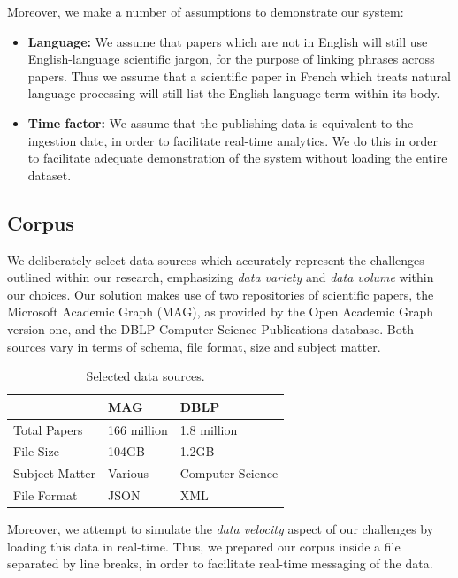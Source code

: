 \documentclass[10pt,journal,final,a4paper]{IEEEtran}
\begin{document}
Moreover, we make a number of assumptions to demonstrate our system:
\begin{itemize}
\item \textbf{Language:} We assume that papers which are not in English will still use English-language scientific jargon, for the purpose of linking phrases across papers. Thus we assume that a scientific paper in French which treats natural language processing will still list the English language term within its body.
\item \textbf{Time factor:} We assume that the publishing data is equivalent to the ingestion date, in order to facilitate real-time analytics. We do this in order to facilitate adequate demonstration of the system without loading the entire dataset. 
\end{itemize}  

\subsection{Corpus}

We deliberately select data sources which accurately represent the challenges outlined within our research, emphasizing \textit{data variety} and \textit{data volume} within our choices. Our solution makes use of two repositories of scientific papers, the Microsoft Academic Graph (MAG), as provided by the Open Academic Graph version one, and the DBLP Computer Science Publications database. Both sources vary in terms of schema, file format, size and subject matter. 

\begin{table}[ht]
\centering
\begin{tabular}{lll}
\hline
               & MAG         & DBLP             \\ \hline
Total Papers   & 166 million & 1.8 million      \\ \hline
File Size      & 104GB       & 1.2GB            \\ \hline
Subject Matter & Various     & Computer Science \\ \hline
File Format    & JSON        & XML              \\ \hline
\end{tabular}
\caption{Selected data sources.}
\end{table}

Moreover, we attempt to simulate the \textit{data velocity} aspect of our challenges by loading this data in real-time. Thus, we prepared our corpus inside a file separated by line breaks, in order to facilitate real-time messaging of the data.
\end{document}
